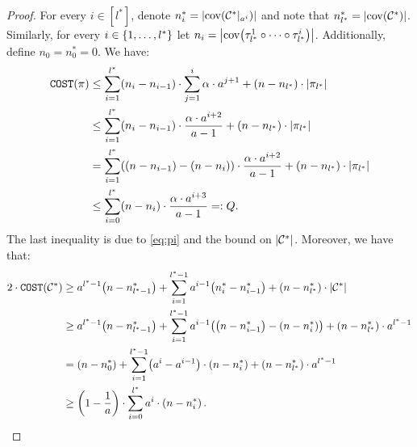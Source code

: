 \begin{proof}
        For every $i\in [l^*]$, denote $n_i^*=\spr{\cov\br{\pref{\cCopt}{a^{i}}}}$ and note that $n_{l^*}^* = \spr{\cov\br{\cCopt}}$. Similarly, for every $i\in \brc{1,\dots,l^*}$ let $n_i=\spr{\cov\br{\tau_{l^*}^1\circ\dots\circ \tau_{l^*}^i}}$. Additionally, define $n_0=n_0^*=0$. We have:
        \begin{align*}
            \COST\br{\pi}&\leq \sum_{i=1}^{l^*}\br{n_i-n_{i-1}}\cdot \sum_{j=1}^{i}\alpha\cdot a^{j+1} + \br{n-n_{l^*}}\cdot \spr{\pi_{l^*}}
            \\&\leq
            \sum_{i=1}^{l^*}\br{n_i-n_{i-1}}\cdot \frac{\alpha\cdot a^{i+2}}{a-1} + \br{n-n_{l^*}}\cdot \spr{\pi_{l^*}}
            \\&=
            \sum_{i=1}^{l^*}\br{\br{n-n_{i-1}}-\br{n-n_i}}\cdot \frac{\alpha\cdot a^{i+2}}{a-1} + \br{n-n_{l^*}}\cdot \spr{\pi_{l^*}}
            \\&\leq
            \sum_{i=0}^{l^*}\br{n-n_i}\cdot \frac{\alpha\cdot a^{i+3}}{a-1} =: Q.
        \end{align*}
        The last inequality is due to \eqref{eq:pi} and the bound on $\spr{\cCopt}$.
        Moreover, we have that:
        \begin{align*}
        2\cdot\COST\br{\cCopt}&\geq a^{l^*-1}\br{n-n_{l^*-1}^*}+ \sum_{i=1}^{l^*-1}a^{i-1}\br{n_i^*-n_{i-1}^*}+\br{n-n_{l^*}^*}\cdot\spr{\cCopt}
        \\&\geq
        a^{l^*-1}\br{n-n_{l^*-1}^*}+ \sum_{i=1}^{l^*-1}a^{i-1}\br{\br{n-n_{i-1}^*}-\br{n-n_{i}^*}}+\br{n-n_{l^*}^*}\cdot a^{l^*-1}
        \\&=
        \br{n-n_0^*}+\sum_{i=1}^{l^*-1}\br{a^{i}-a^{i-1}}\cdot\br{n-n_{i}^*}+\br{n-n_{l^*}^*}\cdot a^{l^*-1}
        \\&\geq
        \br{1-\frac{1}{a}}\cdot\sum_{i=0}^{l^*}a^{i}\cdot \br{n-n_i^*}.
        \end{align*}


\end{proof}
